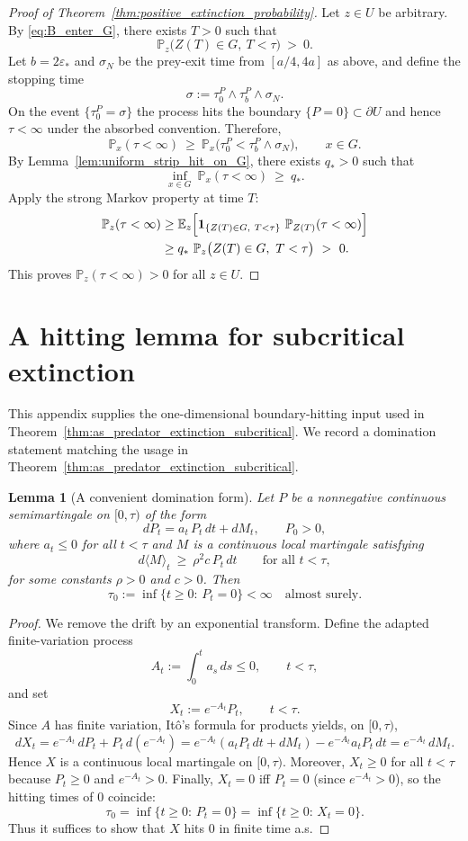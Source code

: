 \documentclass[pdflatex,sn-mathphys-ay]{sn-jnl}
\theoremstyle{thmstyleone}
\newtheorem{lemma}[theorem]{Lemma}
\theoremstyle{definition}
\theoremstyle{remark}
\begin{document}
\begin{appendices}
\begin{proof}[Proof of Theorem~\ref{thm:positive_extinction_probability}]
Let $z\in U$ be arbitrary. By \eqref{eq:B_enter_G}, there exists $T>0$ such that
\[
\mathbb P_z\bigl(Z(T)\in G,\ T<\tau\bigr)\ >\ 0.
\]
Let $b=2\varepsilon_*$ and $\sigma_N$ be the prey-exit time from $[a/4,4a]$ as above, and define the stopping time
\[
\sigma:=\tau_0^P\wedge\tau_b^P\wedge\sigma_N.
\]
On the event $\{\tau_0^P=\sigma\}$ the process hits the boundary $\{P=0\}\subset\partial U$ and hence $\tau<\infty$
under the absorbed convention. Therefore,
\[
\mathbb P_x(\tau<\infty)\ \ge\ \mathbb P_x\bigl(\tau_0^P<\tau_b^P\wedge\sigma_N\bigr),
\qquad x\in G.
\]
By Lemma~\ref{lem:uniform_strip_hit_on_G}, there exists $q_*>0$ such that
\[
\inf_{x\in G}\ \mathbb P_x(\tau<\infty)\ \ge\ q_*.
\]
Apply the strong Markov property at time $T$:
\begin{align*}
\mathbb P_z(\tau<\infty)
&\ge
\mathbb E_z\Bigl[\mathbf 1_{\{Z(T)\in G,\ T<\tau\}}\ \mathbb P_{Z(T)}(\tau<\infty)\Bigr]\\
&\ge
q_*\ \mathbb P_z\bigl(Z(T)\in G,\ T<\tau\bigr)
\ >\ 0.
\end{align*}
This proves $\mathbb P_z(\tau<\infty)>0$ for all $z\in U$.
\end{proof}


\section{A hitting lemma for subcritical extinction}
\label{app:cir_hitting}

This appendix supplies the one-dimensional boundary-hitting input used in
Theorem~\ref{thm:as_predator_extinction_subcritical}. 
We record a domination statement matching the usage in Theorem~\ref{thm:as_predator_extinction_subcritical}.

\begin{lemma}[A convenient domination form]\label{lem:A6_domination_form_A}
Let $P$ be a nonnegative continuous semimartingale on $[0,\tau)$ of the form
\[
dP_t = a_t\,P_t\,dt + dM_t,\qquad P_0>0,
\]
where $a_t\le 0$ for all $t<\tau$ and $M$ is a continuous local martingale satisfying
\[
d\langle M\rangle_t \ \ge\ \rho^2 c\,P_t\,dt
\qquad\text{for all }t<\tau,
\]
for some constants $\rho>0$ and $c>0$.
Then
\[
\tau_0:=\inf\{t\ge 0:\,P_t=0\}<\infty\quad\text{almost surely}.
\]
\end{lemma}

\begin{proof}
We remove the drift by an exponential transform.
Define the adapted finite-variation process
\[
A_t:=\int_0^t a_s\,ds \le 0,
\qquad t<\tau,
\]
and set
\[
X_t:=e^{-A_t}P_t,\qquad t<\tau.
\]
Since $A$ has finite variation, It\^{o}'s formula for products yields, on $[0,\tau)$,
\[
dX_t = e^{-A_t}\,dP_t + P_t\,d(e^{-A_t})
= e^{-A_t}(a_tP_t\,dt+dM_t) - e^{-A_t}a_tP_t\,dt
= e^{-A_t}\,dM_t.
\]
Hence $X$ is a continuous local martingale on $[0,\tau)$.
Moreover, $X_t\ge 0$ for all $t<\tau$ because $P_t\ge 0$ and $e^{-A_t}>0$.
Finally, $X_t=0$ iff $P_t=0$ (since $e^{-A_t}>0$), so the hitting times of $0$ coincide:
\[
\tau_0=\inf\{t\ge0:\,P_t=0\}=\inf\{t\ge0:\,X_t=0\}.
\]
Thus it suffices to show that $X$ hits $0$ in finite time a.s.


\end{proof}
\end{appendices}
\end{document}
